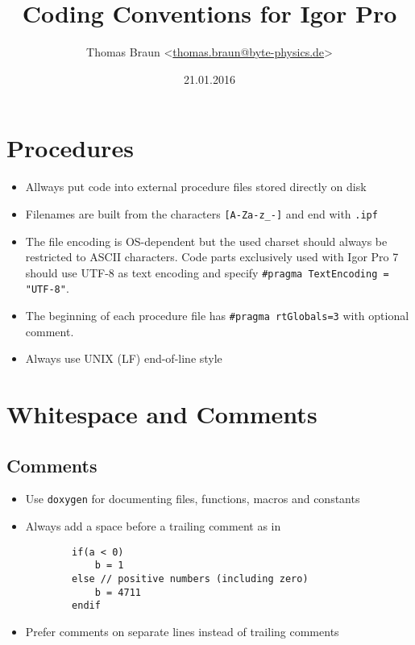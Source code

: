 \documentclass{scrartcl}
\date{21.01.2016}
\author{Thomas Braun <\url{thomas.braun@byte-physics.de}>}
\title{Coding Conventions for Igor Pro}
\begin{document}
%
\maketitle
%
\section{Procedures}
%
\begin{itemize}
	\item Allways put code into external procedure files stored directly on disk
%	
	\item Filenames are built from the characters \texttt{[A-Za-z_-]} and end with \texttt{.ipf}
%	
	\item The file encoding is OS-dependent but the used charset should always be restricted to ASCII characters.
		  Code parts exclusively used with Igor Pro 7 should use UTF-8 as text encoding and specify \texttt{#pragma TextEncoding = "UTF-8"}.
%
	\item The beginning of each procedure file has \texttt{#pragma rtGlobals=3} with optional comment.
%	
	\item Always use UNIX (LF) end-of-line style
\end{itemize}
%
\section{Whitespace and Comments}
%
\subsection*{Comments}
%
\begin{itemize}
	\item Use \texttt{doxygen} for documenting files, functions, macros and constants
%	
	\item Always add a space before a trailing comment as in
	\begin{verbatim}
		if(a < 0)
			b = 1
		else // positive numbers (including zero)
			b = 4711
		endif
	\end{verbatim}
%	
	\item Prefer comments on separate lines instead of trailing comments
%	
\end{itemize}
%	
\end{document}
